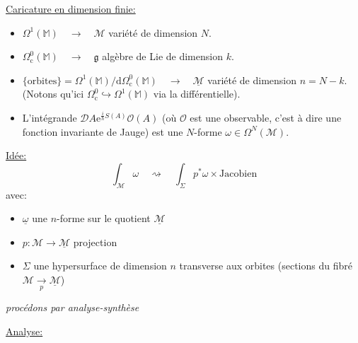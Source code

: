 \documentclass[a4paper,11pt]{article}
\renewcommand{\d}{{\mathrm{d}}}
\newcommand{\D}{{\mathcal{D}}}
\newcommand{\e}{{\mathrm{e}}}
\begin{document}
\noindent \underline{Caricature en dimension finie:}
\begin{itemize}
\item $\Omega^1(\mathbb{M}) \quad \longrightarrow \quad \mathcal{M}$ variété de dimension $N$.
\item $\Omega^0_\mathrm{c}(\mathbb{M}) \quad \longrightarrow\quad \mathfrak{g}$ algèbre de Lie de dimension $k$.
\item $\{\mathrm{orbites}\}=\Omega^1(\mathbb{M})/\d \Omega^0_\mathrm{c}(\mathbb{M}) \quad \longrightarrow\quad \underline{\mathcal{M}}$ variété de dimension $n=N-k$. (Notons qu'ici $\Omega^{0}_\mathrm{c} \hookrightarrow \Omega^1(\mathbb{M})$ via la différentielle).
\item L'intégrande $\D A \e^{\frac{i}{\hbar}S(A)}\mathcal{O}(A)$ (où $\mathcal{O}$ est une observable, c'est à dire une fonction invariante de Jauge) est une $N$-forme $\omega\in\Omega^N(\mathcal{M})$.
\end{itemize}
\underline{Idée:}
$$\int_\mathcal{M} \omega \quad \rightsquigarrow \quad \int_\Sigma p^*\omega \times \mathrm{Jacobien}$$
avec:
\begin{itemize}
\item $\underline\omega$ une $n$-forme sur le quotient $\underline{\mathcal{M}}$
\item $p: \mathcal{M}\to \underline{\mathcal{M}}$ projection
\item $\Sigma$ une hypersurface de dimension $n$ transverse aux orbites (sections du fibré $\mathcal{M}\underset p \to \underline{\mathcal M}$)\\
\end{itemize}
\emph{procédons par analyse-synthèse}

\noindent \underline{Analyse:}
\end{document}
